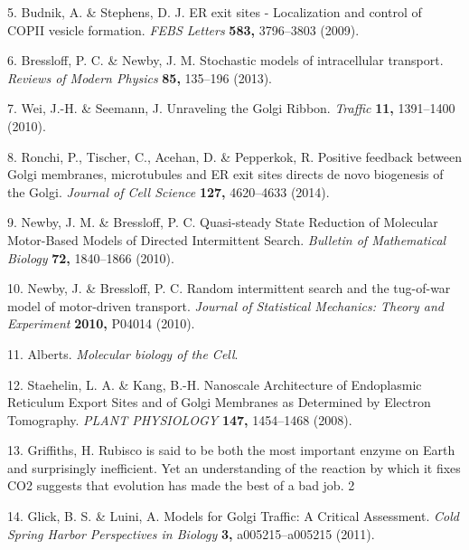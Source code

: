 \documentclass{Dissertate}
\begin{document}
\leavevmode\hypertarget{ref-budnik_er_2009}{}%
5. Budnik, A. \& Stephens, D. J. ER exit sites - Localization and
control of COPII vesicle formation. \emph{FEBS Letters} \textbf{583,}
3796--3803 (2009).

\leavevmode\hypertarget{ref-bressloff_stochastic_2013}{}%
6. Bressloff, P. C. \& Newby, J. M. Stochastic models of intracellular
transport. \emph{Reviews of Modern Physics} \textbf{85,} 135--196
(2013).

\leavevmode\hypertarget{ref-wei_unraveling_2010}{}%
7. Wei, J.-H. \& Seemann, J. Unraveling the Golgi Ribbon. \emph{Traffic}
\textbf{11,} 1391--1400 (2010).

\leavevmode\hypertarget{ref-ronchi_positive_2014}{}%
8. Ronchi, P., Tischer, C., Acehan, D. \& Pepperkok, R. Positive
feedback between Golgi membranes, microtubules and ER exit sites directs
de novo biogenesis of the Golgi. \emph{Journal of Cell Science}
\textbf{127,} 4620--4633 (2014).

\leavevmode\hypertarget{ref-newby_quasi-steady_2010}{}%
9. Newby, J. M. \& Bressloff, P. C. Quasi-steady State Reduction of
Molecular Motor-Based Models of Directed Intermittent Search.
\emph{Bulletin of Mathematical Biology} \textbf{72,} 1840--1866 (2010).

\leavevmode\hypertarget{ref-newby_random_2010}{}%
10. Newby, J. \& Bressloff, P. C. Random intermittent search and the
tug-of-war model of motor-driven transport. \emph{Journal of Statistical
Mechanics: Theory and Experiment} \textbf{2010,} P04014 (2010).

\leavevmode\hypertarget{ref-alberts_molecular_nodate}{}%
11. Alberts. \emph{Molecular biology of the Cell}.

\leavevmode\hypertarget{ref-staehelin_nanoscale_2008}{}%
12. Staehelin, L. A. \& Kang, B.-H. Nanoscale Architecture of
Endoplasmic Reticulum Export Sites and of Golgi Membranes as Determined
by Electron Tomography. \emph{PLANT PHYSIOLOGY} \textbf{147,} 1454--1468
(2008).

\leavevmode\hypertarget{ref-griffiths_rubisco_nodate}{}%
13. Griffiths, H. Rubisco is said to be both the most important enzyme
on Earth and surprisingly inefficient. Yet an understanding of the
reaction by which it fixes CO2 suggests that evolution has made the best
of a bad job. 2

\leavevmode\hypertarget{ref-glick_models_2011}{}%
14. Glick, B. S. \& Luini, A. Models for Golgi Traffic: A Critical
Assessment. \emph{Cold Spring Harbor Perspectives in Biology}
\textbf{3,} a005215--a005215 (2011).
\end{document}
